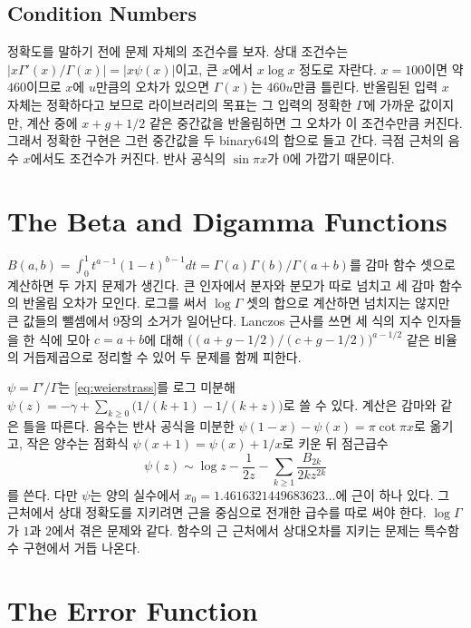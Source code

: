 \subsection{Condition Numbers}

정확도를 말하기 전에 문제 자체의 조건수를 보자. 상대 조건수는 $|x\Gamma'(x)/\Gamma(x)|=|x\psi(x)|$이고, 큰 $x$에서 $x\log x$ 정도로 자란다. $x=100$이면 약 $460$이므로 $x$에 $u$만큼의 오차가 있으면 $\Gamma(x)$는 $460u$만큼 틀린다. 반올림된 입력 $x$ 자체는 정확하다고 보므로 라이브러리의 목표는 그 입력의 정확한 $\Gamma$에 가까운 값이지만, 계산 중에 $x+g+1/2$ 같은 중간값을 반올림하면 그 오차가 이 조건수만큼 커진다. 그래서 정확한 구현은 그런 중간값을 두 binary64의 합으로 들고 간다. 극점 근처의 음수 $x$에서도 조건수가 커진다. 반사 공식의 $\sin\pi x$가 $0$에 가깝기 때문이다.

\section{The Beta and Digamma Functions}
\label{sec:beta-digamma}

 $B(a,b)=\int_0^1t^{a-1}(1-t)^{b-1}dt=\Gamma(a)\Gamma(b)/\Gamma(a+b)$를 감마 함수 셋으로 계산하면 두 가지 문제가 생긴다. 큰 인자에서 분자와 분모가 따로 넘치고 세 감마 함수의 반올림 오차가 모인다. 로그를 써서 $\log\Gamma$ 셋의 합으로 계산하면 넘치지는 않지만 큰 값들의 뺄셈에서 9장의 소거가 일어난다. Lanczos 근사를 쓰면 세 식의 지수 인자들을 한 식에 모아 $c=a+b$에 대해 $\bigl((a+g-1/2)/(c+g-1/2)\bigr)^{a-1/2}$ 같은 비율의 거듭제곱으로 정리할 수 있어 두 문제를 함께 피한다.

 $\psi=\Gamma'/\Gamma$는 \eqref{eq:weierstrass}를 로그 미분해 $\psi(z)=-\gamma+\sum_{k\ge0}\bigl(1/(k+1)-1/(k+z)\bigr)$로 쓸 수 있다. 계산은 감마와 같은 틀을 따른다. 음수는 반사 공식을 미분한 $\psi(1-x)-\psi(x)=\pi\cot\pi x$로 옮기고, 작은 양수는 점화식 $\psi(x+1)=\psi(x)+1/x$로 키운 뒤 점근급수
\[
\psi(z)\sim\log z-\frac1{2z}-\sum_{k\ge1}\frac{B_{2k}}{2kz^{2k}}
\]
를 쓴다. 다만 $\psi$는 양의 실수에서 $x_0=1.4616321449683623\dots$에 근이 하나 있다. 그 근처에서 상대 정확도를 지키려면 근을 중심으로 전개한 급수를 따로 써야 한다\cite{cody1973psi}. $\log\Gamma$가 $1$과 $2$에서 겪은 문제와 같다. 함수의 근 근처에서 상대오차를 지키는 문제는 특수함수 구현에서 거듭 나온다.

\section{The Error Function}
\label{sec:erf}

